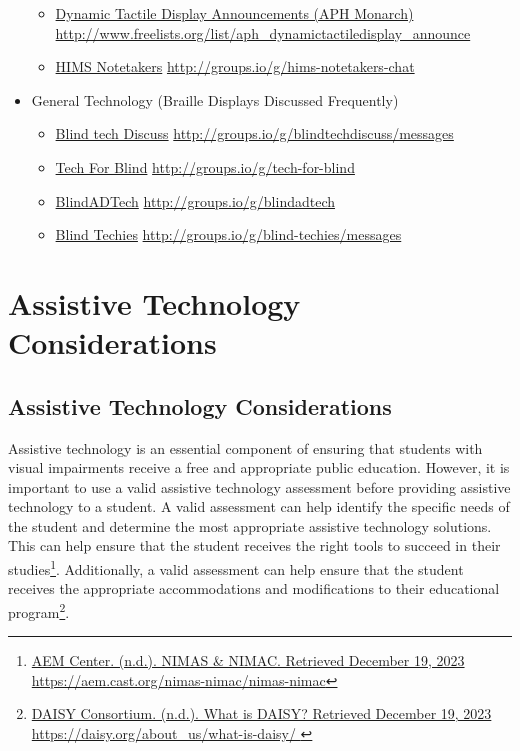 \documentclass[12pt,letterpaper,twoside,openright]{report}
\begin{document}
\begin{appendices}
\begin{itemize}[leftmargin=*]
\begin{itemize}[leftmargin=2em]
\item \href{http://www.freelists.org/list/aph_dynamictactiledisplay_announce}{Dynamic Tactile Display Announcements (APH Monarch)}  \break\url{http://www.freelists.org/list/aph_dynamictactiledisplay_announce}
\item \href{http://groups.io/g/hims-notetakers-chat}{HIMS Notetakers}  \break\url{http://groups.io/g/hims-notetakers-chat}
\end{itemize}
\item General Technology (Braille Displays Discussed Frequently)
\begin{itemize}[leftmargin=2em]
\item \href{http://groups.io/g/blindtechdiscuss/messages}{Blind tech Discuss}  \break\url{http://groups.io/g/blindtechdiscuss/messages}
\item \href{http://groups.io/g/tech-for-blind}{Tech For Blind}  \break\url{http://groups.io/g/tech-for-blind}
\item \href{http://groups.io/g/blindadtech}{BlindADTech}  \break\url{http://groups.io/g/blindadtech}
\item \href{http://groups.io/g/blind-techies/messages}{Blind Techies}  \break\url{http://groups.io/g/blind-techies/messages}
\end{itemize}
\end{itemize}

\cleardoublepage\hypertarget{trouble3}{}\chapter[\raggedright Assistive Technology Considerations\hfill\break ]{Assistive Technology Considerations}\label{trouble3}
\minitoc \newpage
\hypertarget{trouble5}{}\section[Assistive Technology Considerations]{Assistive Technology Considerations}\label{trouble5}
\minitoc \newpage
Assistive technology is an essential component of ensuring that students with visual impairments receive a free and appropriate public education. However, it is important to use a valid assistive technology assessment before providing assistive technology to a student. A valid assessment can help identify the specific needs of the student and determine the most appropriate assistive technology solutions. This can help ensure that the student receives the right tools to succeed in their studies\footnote{\raggedright \href{https://aem.cast.org/nimas-nimac/nimas-nimac}{AEM Center. (n.d.). NIMAS \& NIMAC. Retrieved December 19, 2023} \url{https://aem.cast.org/nimas-nimac/nimas-nimac}}. Additionally, a valid assessment can help ensure that the student receives the appropriate accommodations and modifications to their educational program\footnote{\raggedright \href{https://daisy.org/about_us/what-is-daisy/ }{DAISY Consortium. (n.d.). What is DAISY? Retrieved December 19, 2023} \url{https://daisy.org/about_us/what-is-daisy/ }}.


\end{appendices}
\end{document}
